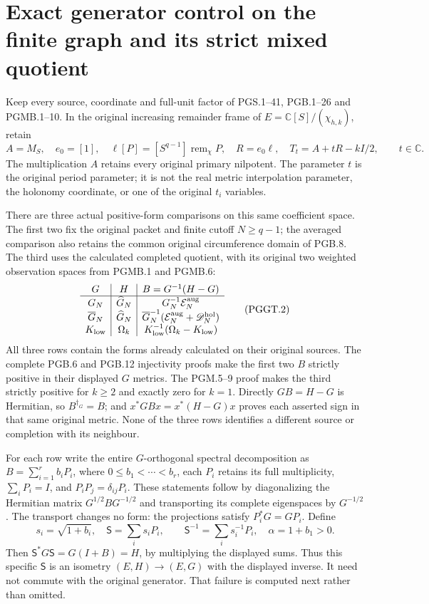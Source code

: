 \section{Exact generator control on the finite graph and its strict mixed quotient}
\label{sec:pggt}

Keep every source, coordinate and full-unit factor of
PGS.1--41, PGB.1--26 and PGMB.1--10. In the original increasing
remainder frame of $E=\mathbb{C}[S]/(\chi_{h,k})$, retain
\[
 A=M_S,\quad e_0=[1],\quad
 \ell[P]=[S^{q-1}]\operatorname{rem}_{\chi}P,\quad
 R=e_0\ell,\quad T_t=A+tR-kI/2,\qquad t\in\mathbb{C}.
 \tag{PGGT.1}\label{eq:pggt-original-generator}
\]
The multiplication $A$ retains every original primary
nilpotent. The parameter $t$ is the original period parameter;
it is not the real metric interpolation parameter, the
holonomy coordinate, or one of the original $t_i$ variables.

There are three actual positive-form comparisons on this same
coefficient space. The first two fix the original packet and
finite cutoff $N\geq q-1$; the averaged comparison also retains
the common original circumference domain of PGB.8. The third
uses the calculated completed quotient, with its original
two weighted observation spaces from PGMB.1 and PGMB.6:
\[
\begin{array}{c|c|c}
 G&H&B=G^{-1}(H-G)\\ \hline
 G_N&\widehat G_N&G_N^{-1}\mathcal E_N^{\rm aug}\\
 \overline G_N&\widehat G_N&
 \overline G_N^{-1}(\mathcal E_N^{\rm aug}+\mathscr D_N^{\rm hol})\\
 K_{\rm low}&\Omega_k&K_{\rm low}^{-1}
                                  (\Omega_k-K_{\rm low})
\end{array}
\tag{PGGT.2}\label{eq:pggt-three-comparisons}
\]
All three rows contain the forms already calculated on their
original sources. The complete PGB.6 and PGB.12 injectivity
proofs make the first two $B$ strictly positive in their
displayed $G$ metrics. The PGM.5--9 proof makes the third
strictly positive for $k\geq2$ and exactly zero for $k=1$.
Directly $GB=H-G$ is Hermitian, so $B^{\dagger_G}=B$;
and $x^*GBx=x^*(H-G)x$ proves each asserted sign in that
same original metric. None of the three rows identifies a
different source or completion with its neighbour.

For each row write the entire $G$-orthogonal spectral
decomposition as $B=\sum_{i=1}^r b_iP_i$, where
$0\leq b_1<\cdots<b_r$, each $P_i$ retains its full
multiplicity, $\sum_iP_i=I$, and $P_iP_j=\delta_{ij}P_i$.
These statements follow by diagonalizing the Hermitian
matrix $G^{1/2}BG^{-1/2}$ and transporting its complete
eigenspaces by $G^{-1/2}$. The transport changes no form:
the projections satisfy $P_i^*G=GP_i$. Define
\[
 s_i=\sqrt{1+b_i},\quad
 \mathsf S=\sum_i s_iP_i,\qquad
 \mathsf S^{-1}=\sum_i s_i^{-1}P_i,\quad
 \alpha=1+b_1>0.
 \tag{PGGT.3}\label{eq:pggt-exact-isometry}
\]
Then $\mathsf S^*G\mathsf S=G(I+B)=H$, by multiplying
the displayed sums. Thus this specific $\mathsf S$ is an
isometry $(E,H)\to(E,G)$ with the displayed inverse.
It need not commute with the original generator. That
failure is computed next rather than omitted.

